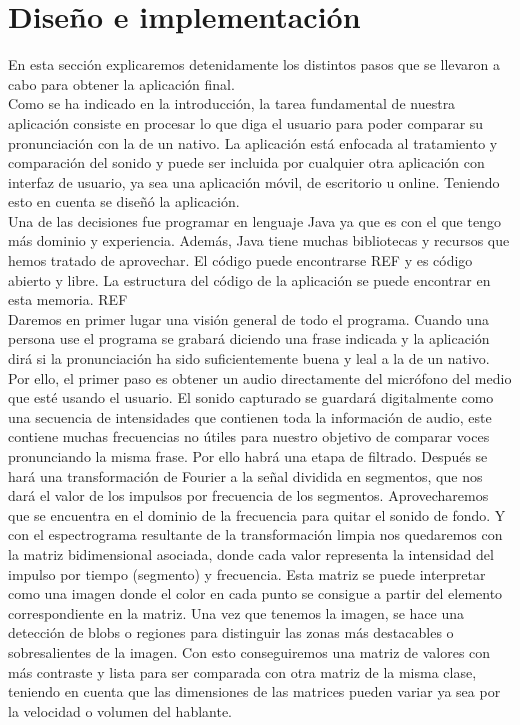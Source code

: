 
\chapter{Diseño e implementación} %

\label{Chapter2} %

En esta sección explicaremos detenidamente los distintos pasos que se llevaron a cabo para obtener la aplicación final. \\

Como se ha indicado en la introducción, la tarea fundamental de nuestra aplicación consiste en procesar lo que diga el usuario para poder comparar su pronunciación con la de un nativo. La aplicación está enfocada al tratamiento y comparación del sonido y puede ser incluida por cualquier otra aplicación con interfaz de usuario, ya sea una aplicación móvil, de escritorio u online. Teniendo esto en cuenta se diseñó la aplicación.\\

Una de las decisiones fue programar en lenguaje Java ya que es con el que tengo más dominio y experiencia.  %
Además, Java tiene muchas bibliotecas y recursos que hemos tratado de aprovechar. El código puede encontrarse REF \cite{REF} %
 y es código abierto y libre. La estructura del código de la aplicación se puede encontrar en esta memoria. REF \cite{REF} \\ %

Daremos en primer lugar una visión general de todo el programa. Cuando una persona use el programa se grabará diciendo una frase indicada y la aplicación dirá si la pronunciación ha sido suficientemente buena y leal a la de un nativo. Por ello, el primer paso es obtener un audio directamente del micrófono del medio que esté usando el usuario. El sonido capturado se guardará digitalmente como una secuencia de intensidades que contienen toda la información de audio, este contiene muchas frecuencias no útiles para nuestro objetivo de comparar voces pronunciando la misma frase. Por ello habrá una etapa de filtrado. Después se hará una transformación de Fourier a la señal dividida en segmentos, que nos dará el valor de los impulsos por frecuencia de los segmentos. Aprovecharemos que se encuentra en el dominio de la frecuencia para quitar el sonido de fondo. Y con el espectrograma resultante de la transformación limpia nos quedaremos con la matriz bidimensional asociada, donde cada valor representa la intensidad del impulso por tiempo (segmento) y frecuencia. Esta matriz se puede interpretar como una imagen donde el color en cada punto se consigue a partir del elemento correspondiente en la matriz. Una vez que tenemos la imagen, se hace una detección de blobs o regiones para distinguir las zonas más destacables o sobresalientes de la imagen. Con esto conseguiremos una matriz de valores con más contraste y lista para ser comparada con otra matriz de la misma clase, teniendo en cuenta que las dimensiones de las matrices pueden variar ya sea por la velocidad o volumen del hablante.\\

